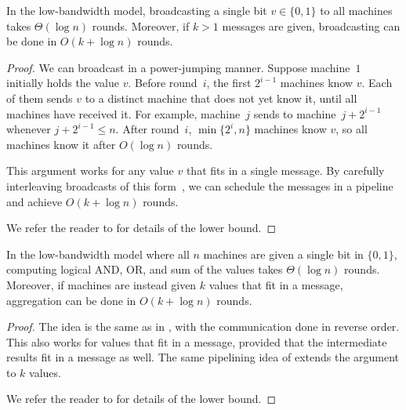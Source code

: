 \begin{lemma}
	\label{lem:broadcast}
	In the low-bandwidth model, broadcasting a single bit $v \in \{0,1\}$ to all machines takes $\Theta(\log n)$ rounds. Moreover, if $k>1$ messages are given, broadcasting can be done in $O(k+ \log n)$ rounds.
\end{lemma}
\begin{proof}
	We can broadcast in a power-jumping manner. Suppose machine~$1$ initially holds the value $v$. Before round~$i$, the first $2^{i-1}$ machines know $v$. Each of them sends $v$ to a distinct machine that does not yet know it, until all machines have received it. For example, machine~$j$ sends to machine~$j+2^{i-1}$ whenever $j+2^{i-1}\leq n$. After round~$i$, $\min\{2^i,n\}$ machines know $v$, so all machines know it after $O(\log n)$ rounds.
	
	This argument works for any value $v$ that fits in a single message. By carefully interleaving broadcasts of this form~\cite{kannan-ballard-park-2016-a-high-performance-parallel}, we can schedule the messages in a pipeline and achieve $O(k+\log n)$ rounds.
	
	We refer the reader to \cite[Lemma 6.9]{gupta-korhonen-etal-2025-low-bandwidth-matrix} for details of the lower bound.
\end{proof}

\begin{lemma}
	\label{lem:aggregation}
	In the low-bandwidth model where all $n$ machines are given a single bit in $\{0,1\}$, computing logical AND, OR, and sum of the values takes $\Theta(\log n)$ rounds. Moreover, if machines are instead given $k$ values that fit in a message, aggregation can be done in $O(k + \log n)$ rounds.
\end{lemma}
\begin{proof}
	The idea is the same as in , with the communication done in reverse order. This also works for values that fit in a message, provided that the intermediate results fit in a message as well. The same pipelining idea of \cite{kannan-ballard-park-2016-a-high-performance-parallel} extends the argument to $k$ values.
	
	We refer the reader to \cite[Lemma 6.4]{gupta-korhonen-etal-2025-low-bandwidth-matrix} for details of the lower bound.
\end{proof}

